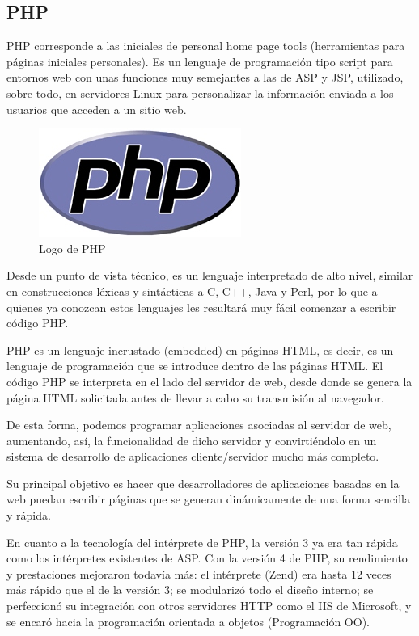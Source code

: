 \subsection{PHP}
PHP corresponde a las iniciales de personal home page tools (herramientas para páginas iniciales personales). Es un lenguaje de programación tipo script para entornos web con unas funciones muy semejantes a las de ASP y JSP, utilizado, sobre todo, en servidores Linux para personalizar la información enviada a los usuarios que acceden a un sitio web. 

\begin{figure}[ht]
    \centering
    \includegraphics{imagenes/php-big.jpg}
    \caption{Logo de PHP}
    \label{fig:logophpl}
\end{figure}

Desde un punto de vista técnico, es un lenguaje interpretado de alto nivel, similar en construcciones léxicas y sintácticas a C, C++, Java y Perl, por lo que a quienes ya conozcan estos lenguajes les resultará muy fácil comenzar a escribir código PHP.

PHP es un lenguaje incrustado (embedded) en páginas HTML, es decir, es un lenguaje de programación que se introduce dentro de las páginas HTML. El código PHP se interpreta en el lado del servidor de web, desde donde se genera la página HTML solicitada antes de llevar a cabo su transmisión al navegador.

De esta forma, podemos programar aplicaciones asociadas al servidor de web, aumentando, así, la funcionalidad de dicho servidor y convirtiéndolo en un sistema de desarrollo de aplicaciones cliente/servidor mucho más completo.

Su principal objetivo es hacer que desarrolladores de aplicaciones basadas en la web puedan escribir páginas que se generan dinámicamente de una forma sencilla y rápida.

En cuanto a la tecnología del intérprete de PHP, la versión 3 ya era tan rápida como los intérpretes existentes de ASP. Con la versión 4 de PHP, su rendimiento y prestaciones mejoraron todavía más: el intérprete (Zend) era hasta
12 veces más rápido que el de la versión 3; se modularizó todo el diseño interno; se perfeccionó su integración con otros servidores HTTP como el IIS de Microsoft, y se encaró hacia la programación orientada a objetos (Programación OO). 

